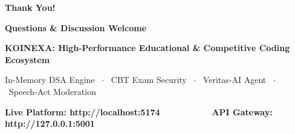 \documentclass[aspectratio=169,10pt]{beamer}
\begin{document}
\begin{frame}[plain]
  \vspace*{1.2cm}
  \begin{center}
    {\fontsize{40}{46}\selectfont\textbf{\textcolor{KoinexaRed}{Thank You!}}}\par
    \vspace{0.35cm}
    {\fontsize{16}{20}\selectfont\textbf{\textcolor{KoinexaOrange}{Questions \& Discussion Welcome}}}\par
    \vspace{0.45cm}
    {\fontsize{12}{15}\selectfont\textbf{KOINEXA: High-Performance Educational \& Competitive Coding Ecosystem}}\par
    \vspace{0.2cm}
    {\fontsize{10}{13}\selectfont\textcolor{KoinexaGray}{In-Memory DSA Engine \ $\cdot$ \ CBT Exam Security \ $\cdot$ \ Veritas-AI Agent \ $\cdot$ \ Speech-Act Moderation}}\par
    \vspace{1.0cm}
    {\fontsize{10}{13}\selectfont\textbf{\textcolor{KoinexaRed}{Live Platform: http://localhost:5174 \ \ \ \ \ \ \ \ \ \ API Gateway: http://127.0.0.1:5001}}}
  \end{center}
\end{frame}
\end{document}
